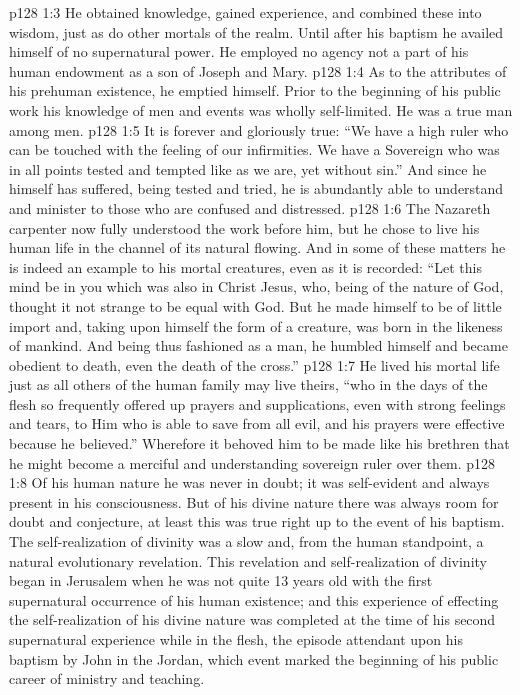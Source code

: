 \vs p128 1:3 He obtained knowledge, gained experience, and combined these into wisdom, just as do other mortals of the realm. Until after his baptism he availed himself of no supernatural power. He employed no agency not a part of his human endowment as a son of Joseph and Mary.
\vs p128 1:4 As to the attributes of his prehuman existence, he emptied himself. Prior to the beginning of his public work his knowledge of men and events was wholly self\hyp{}limited. He was a true man among men.
\vs p128 1:5 \pc It is forever and gloriously true: “We have a high ruler who can be touched with the feeling of our infirmities. We have a Sovereign who was in all points tested and tempted like as we are, yet without sin.” And since he himself has suffered, being tested and tried, he is abundantly able to understand and minister to those who are confused and distressed.
\vs p128 1:6 \pc The Nazareth carpenter now fully understood the work before him, but he chose to live his human life in the channel of its natural flowing. And in some of these matters he is indeed an example to his mortal creatures, even as it is recorded: “Let this mind be in you which was also in Christ Jesus, who, being of the nature of God, thought it not strange to be equal with God. But he made himself to be of little import and, taking upon himself the form of a creature, was born in the likeness of mankind. And being thus fashioned as a man, he humbled himself and became obedient to death, even the death of the cross.”
\vs p128 1:7 He lived his mortal life just as all others of the human family may live theirs, “who in the days of the flesh so frequently offered up prayers and supplications, even with strong feelings and tears, to Him who is able to save from all evil, and his prayers were effective because he believed.” Wherefore it behoved him  to be made like his brethren that he might become a merciful and understanding sovereign ruler over them.
\vs p128 1:8 Of his human nature he was never in doubt; it was self\hyp{}evident and always present in his consciousness. But of his divine nature there was always room for doubt and conjecture, at least this was true right up to the event of his baptism. The self\hyp{}realization of divinity was a slow and, from the human standpoint, a natural evolutionary revelation. This revelation and self\hyp{}realization of divinity began in Jerusalem when he was not quite 13 years old with the first supernatural occurrence of his human existence; and this experience of effecting the self\hyp{}realization of his divine nature was completed at the time of his second supernatural experience while in the flesh, the episode attendant upon his baptism by John in the Jordan, which event marked the beginning of his public career of ministry and teaching.
